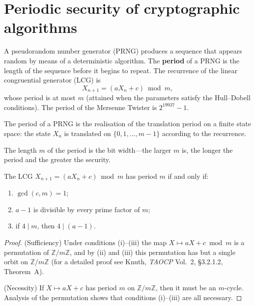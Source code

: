 \section{Periodic security of cryptographic algorithms}

\begin{definition}\label{def:prng_period}
A pseudorandom number generator (PRNG) produces a sequence that appears random by means of a deterministic algorithm. The \textbf{period} of a PRNG is the length of the sequence before it begins to repeat. The recurrence of the linear congruential generator (LCG) is
\[
X_{n+1} = (a X_n + c) \bmod m,
\]
whose period is at most $m$ (attained when the parameters satisfy the Hull--Dobell conditions). The period of the Mersenne Twister is $2^{19937}-1$.

The period of a PRNG is the realisation of the translation period on a finite state space: the state $X_n$ is translated on $\{0,1,\dots,m-1\}$ according to the recurrence.

The length $m$ of the period is the bit width---the larger $m$ is, the longer the period and the greater the security.
\end{definition}

\begin{lemma}\label{lem:hull_dobell}
The LCG $X_{n+1} = (a X_n + c) \bmod m$ has period $m$ if and only if:
\begin{enumerate}[label=(\roman*)]
    \item $\gcd(c, m) = 1$;
    \item $a - 1$ is divisible by every prime factor of $m$;
    \item if $4 \mid m$, then $4 \mid (a - 1)$.
\end{enumerate}
\end{lemma}

\begin{proof}
(Sufficiency) Under conditions (i)--(iii) the map $X \mapsto aX + c \bmod m$ is a permutation of $\mathbb Z/m\mathbb Z$, and by (ii) and (iii) this permutation has but a single orbit on $\mathbb Z/m\mathbb Z$ (for a detailed proof see Knuth, \textit{TAOCP} Vol.~2, \S{}3.2.1.2, Theorem~A).

(Necessity) If $X \mapsto aX+c$ has period $m$ on $\mathbb Z/m\mathbb Z$, then it must be an $m$-cycle. Analysis of the permutation shows that conditions (i)--(iii) are all necessary.
\end{proof}

